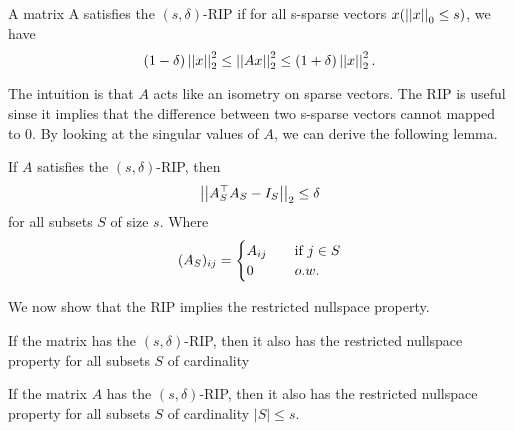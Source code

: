 \documentclass[11pt]{article}
\begin{document}
\begin{definition}
    A matrix A satisfies the \((s,\delta)\)-RIP if for all s-sparse vectors \(x(\left|\left|x\right|\right|_0 \leq s)\), we have
    \[(1 - \delta)\left|\left|x\right|\right|_2^2 \leq \left|\left|Ax\right|\right|^2_2 \leq (1 + \delta)\left|\left|x\right|\right|^2_2.\]
\end{definition}

The intuition is that \(A\) acts like an isometry on sparse vectors. The RIP is useful sinse it implies that the difference between two s-sparse vectors cannot mapped to 0. By looking at the singular values of \(A\), we can derive the following lemma.

\begin{lemma}
    If \(A\) satisfies the \((s,\delta)\)-RIP, then 
    \[\left|\left|A^\top_SA_S-I_S\right|\right|_2 \leq \delta\]
    for all subsets \(S\) of size \(s\). Where 
    \[(A_S)_{ij} = 
    \begin{cases}
        A_{ij} \quad &\textnormal{if } j \in S\\
        0 &o.w.
    \end{cases}
    \]
\end{lemma}

We now show that the RIP implies the restricted nullspace property.

\begin{theorem}
    If the matrix has the \((s,\delta)\)-RIP, then it also has the restricted nullspace property for all subsets \(S\) of cardinality
\end{theorem}

\begin{theorem}
    If the matrix \(A\) has the \((s,\delta)\)-RIP, then it also has the restricted nullspace property for all subsets \(S\) of cardinality \(|S| \leq s\).
\end{theorem}
\end{document}

